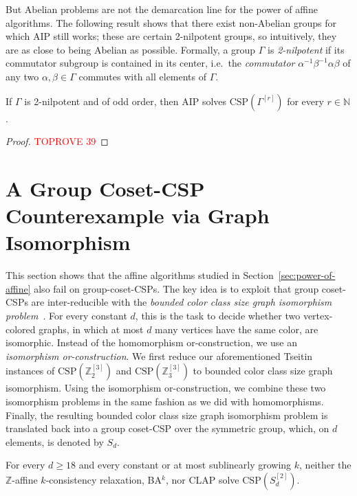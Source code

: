 \documentclass[a4paper,english, thm-restate]{lipics-v2021}
\newcommand{\ZZ}{\mathbb{Z}}
\newcommand{\CSP}[1]{\mathrm{CSP}(#1)}
\newcommand{\bbN}{\mathbb{N}}
\newcommand{\CosetGrpTmplt}[2]{#1^{[#2]}}
\newcommand{\Sym}[1]{S_{#1}}
\begin{document}
	But Abelian problems are not the demarcation line for the power of affine algorithms. The following result shows that there exist non-Abelian groups for which AIP still works; these are certain 2-nilpotent groups, so intuitively, they are as close to being Abelian as possible. Formally, a group $\Gamma$ is \emph{2-nilpotent} if its commutator subgroup is contained in its center, i.e.\ the \emph{commutator} $\alpha^{-1}\beta^{-1}\alpha\beta$ of any two $\alpha,\beta \in \Gamma$ commutes with all elements of $\Gamma$. 
	\begin{theorem}
		\label{thm:AIPsolvesOdd2nilpotent}
		If $\Gamma$ is 2-nilpotent and of odd order, then AIP solves $\CSP{\CosetGrpTmplt{\Gamma}{r}}$ for every $r \in \bbN$. \end{theorem}
	\begin{proof}\textcolor{red}{TOPROVE 39}\end{proof}	
	
	
	
	
	\section{A Group Coset-CSP Counterexample via Graph Isomorphism}
	\label{app:isomorphism}
	
	This section shows that the affine algorithms studied in Section~\ref{sec:power-of-affine} also fail on group-coset-CSPs.
	The key idea is to exploit that  group coset-CSPs are inter-reducible
	with the \emph{bounded color class size graph isomorphism problem}~\cite{BerkholzGrohe2017}.
	For every constant $d$, this is the task to decide whether two vertex-colored graphs, in which at most $d$ many vertices have the same color, are isomorphic.
	Instead of the homomorphism or-construction,
	we use an \emph{isomorphism or-construction}.
	We first reduce our aforementioned Tseitin instances of $\CSP{\CosetGrpTmplt{\ZZ_2}{3}}$ and
	$\CSP{\CosetGrpTmplt{\ZZ_3}{3}}$
	to bounded color class size graph isomorphism.
	Using the isomorphism or-construction, we combine these two isomorphism problems
	in the same fashion as we did with homomorphisms.
	Finally, the resulting bounded color class size graph isomorphism problem
	is translated back into a group coset-CSP over the symmetric group,
	which, on $d$ elements, is denoted by $\Sym{d}$.
	
	\begin{theorem}
		\label{thm:counterexampleSymmetricGroup}
		For every $d \geq 18$ and every constant or at most sublinearly growing $k$, neither the $\ZZ$-affine $k$-consistency relaxation, BA$^{k}$, nor CLAP solve $\CSP{\CosetGrpTmplt{\Sym{d}}{2}}$. 
	\end{theorem}	
	
\end{document}
